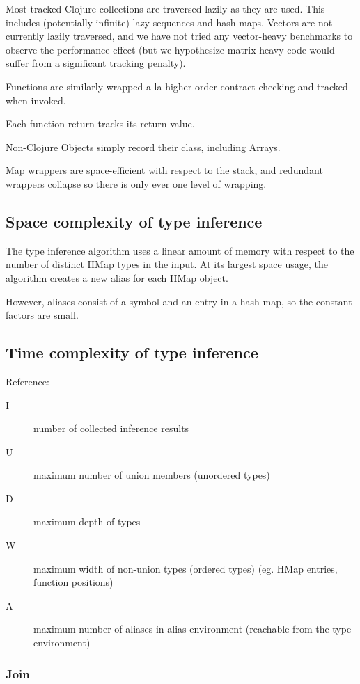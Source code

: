 Most tracked Clojure collections are traversed lazily as they are used.
This includes (potentially infinite) lazy sequences and hash maps.
Vectors are not currently lazily traversed, and we have not tried any vector-heavy
benchmarks to observe the performance effect (but we hypothesize matrix-heavy
code would suffer from a significant tracking penalty).

Functions are similarly wrapped a la higher-order contract checking and tracked when invoked.

Each function return tracks its return value.

Non-Clojure Objects simply record their class, including Arrays.

Map wrappers are space-efficient with respect to the stack, and
redundant wrappers collapse so there is only ever one level of
wrapping.

\pagebreak

\subsection{Space complexity of type inference}

The type inference algorithm uses a linear amount of memory with respect
to the number of distinct HMap types in the input.
At its largest space usage, the algorithm creates a new alias for each HMap object.

However, aliases consist of a symbol and an entry in a hash-map, so the constant
factors are small.

\subsection{Time complexity of type inference}

Reference:

\begin{description}
  \item [I] number of collected inference results
  \item [U] maximum number of union members (unordered types)
  \item [D] maximum depth of types
  \item [W] maximum width of non-union types (ordered types) (eg. HMap entries, function positions)
  \item [A] maximum number of aliases in alias environment (reachable from the type environment)
\end{description}

\subsubsection{Join}

